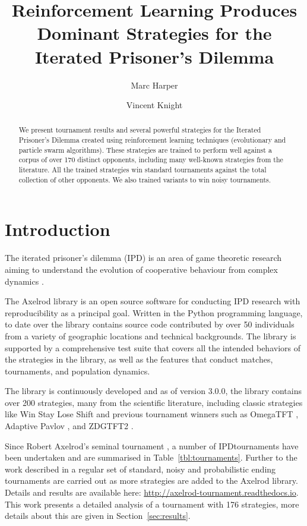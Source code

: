 \documentclass{article}
\title{Reinforcement Learning Produces Dominant Strategies for the
Iterated Prisoner's Dilemma}
\author{Marc Harper \and Vincent Knight} %
\date{}
\begin{document}
\maketitle

\begin{abstract}
    We present tournament results and several powerful strategies for the Iterated
    Prisoner's Dilemma created using reinforcement learning techniques
    (evolutionary and particle swarm algorithms). These strategies are
    trained to perform well against a corpus of over 170 distinct
    opponents, including many well-known strategies from the literature. All
    the trained strategies win standard tournaments against the total collection
    of other opponents. We also trained variants to win noisy tournaments.
\end{abstract}

\section{Introduction}\label{sec:introduction}

The iterated prisoner's dilemma (IPD) is an area of game theoretic research
aiming to understand the evolution of cooperative behaviour from complex
dynamics \cite{Axelrod1984}.

The Axelrod library \cite{axelrodproject, knight2016open} is an open source
software for conducting IPD research with
reproducibility as a principal goal. Written in the Python programming language,
to date over the library contains source code contributed by over 50 individuals
from a variety of geographic locations and technical backgrounds. The library
is supported by a comprehensive test suite that covers all the intended
behaviors of the strategies in the library, as well as the features that
conduct matches, tournaments, and population dynamics.

The library is continuously developed and as of version 3.0.0, the library
contains over 200 strategies, many from the scientific literature, including
classic strategies like Win Stay Lose Shift \cite{nowak1993strategy} and
previous tournament winners such as OmegaTFT \cite{slany2007some}, Adaptive
Pavlov \cite{li2007design}, and ZDGTFT2 \cite{Stewart2012}.

Since Robert Axelrod's seminal tournament \cite{Axelrod1980a}, a number of
IPD\@ tournaments have been undertaken and are summarised in
Table~\ref{tbl:tournaments}. Further to the work described in
\cite{knight2016open} a regular set of standard, noisy and probabilistic ending
tournaments are carried out as more strategies are added to the Axelrod library.
Details and results are available here:
\url{http://axelrod-tournament.readthedocs.io}. This work presents a detailed
analysis of a tournament with 176 strategies, more details about this are given
in Section~\ref{sec:results}.
\end{document}
